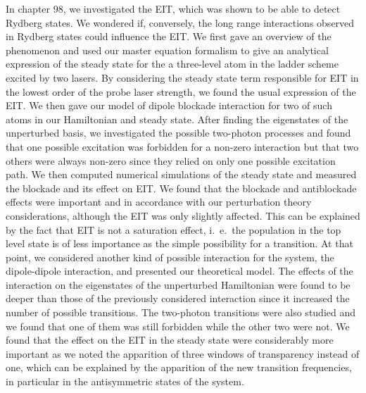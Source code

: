 In chapter 98, we investigated the EIT, which was shown to be able to detect Rydberg states. We wondered if, conversely, the long range interactions observed in Rydberg states could influence the EIT. We first gave an overview of the phenomenon and used our master equation formalism to give an analytical expression of the steady state for the a three-level atom in the ladder scheme excited by two lasers. By considering the steady state term responsible for EIT in the lowest order of the probe laser strength, we found the usual expression of the EIT. We then gave our model of dipole blockade interaction for two of such atoms in our Hamiltonian and steady state. After finding the eigenstates of the unperturbed basis, we investigated the possible two-photon processes and found that one possible excitation was forbidden for a non-zero interaction but that two others were always non-zero since they relied on only one possible excitation path. We then computed numerical simulations of the steady state and measured the blockade and its effect on EIT. We found that the blockade and antiblockade effects were important and in accordance with our perturbation theory considerations, although the EIT was only slightly affected. This can be explained by the fact that EIT is not a saturation effect, i.~e.~the population in the top level state is of less importance as the simple possibility for a  transition. At that point, we considered another kind of possible interaction for the system, the dipole-dipole interaction, and presented our theoretical model. The effects of the interaction on the eigenstates of the unperturbed Hamiltonian were found to be deeper than those of the previously considered interaction since it increased the number of possible transitions. The two-photon transitions were also studied and we found that one of them was still forbidden while the other two were not. We found that the effect on the EIT in the steady state were considerably more important as we noted the apparition of three windows of transparency instead of one, which can be explained by the apparition of the new transition frequencies, in particular in the antisymmetric states of the system.

